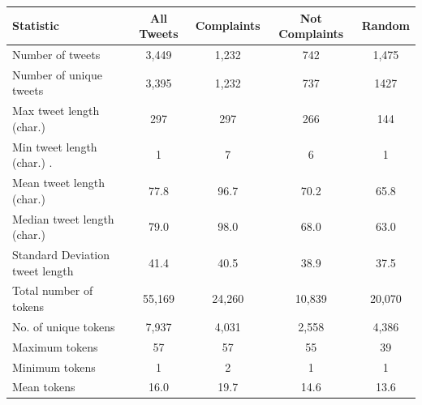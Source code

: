 \begin{table}[htbp]
    \captionsetup{font=small}
    \centering
    \begin{tabularx}{\textwidth}{|X|c|c|c|c|}
        \hline
        \rowcolor[gray]{0.7}
        \textbf{Statistic}              & \textbf{All Tweets} & \textbf{Complaints} & \textbf{Not Complaints} & \textbf{Random} \\
        \hline
        Number of tweets                & 3,449               & 1,232               & 742                     & 1,475           \\
        \hline
        Number of unique tweets         & 3,395               & 1,232               & 737                     & 1427            \\
        \hline
        \hline
        Max tweet length (char.)        & 297                 & 297                 & 266                     & 144             \\
        \hline
        Min tweet length (char.)   .    & 1                   & 7                   & 6                       & 1               \\
        \hline
        Mean tweet length (char.)       & 77.8                & 96.7                & 70.2                    & 65.8            \\
        \hline
        Median tweet length (char.)     & 79.0                & 98.0                & 68.0                    & 63.0            \\
        \hline
        Standard Deviation tweet length & 41.4                & 40.5                & 38.9                    & 37.5            \\
        \hline
        \hline
        Total number of tokens          & 55,169              & 24,260              & 10,839                  & 20,070          \\
        \hline
        No. of unique tokens            & 7,937               & 4,031               & 2,558                   & 4,386           \\
        \hline
        Maximum tokens                  & 57                  & 57                  & 55                      & 39              \\
        \hline
        Minimum tokens                  & 1                   & 2                   & 1                       & 1               \\
        \hline
        Mean tokens                     & 16.0                & 19.7                & 14.6                    & 13.6            \\

\end{tabularx}
\end{table}
